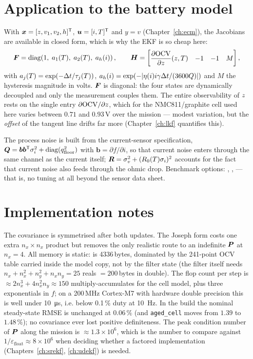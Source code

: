 \section{Application to the battery model}
With $\bm{x}=[z,v_1,v_2,h]^{\mathsf{T}}$, $\bm{u}=[i,T]^{\mathsf{T}}$ and $y=v$ (Chapter~\ref{ch:ecm}), the
Jacobians are available in closed form, which is why the EKF is so cheap here:
\begin{equation}
\bm{F} = \operatorname{diag}\!\left(1,\;a_1(T),\;a_2(T),\;a_h(i)\right), \qquad
\bm{H} = \begin{bmatrix}\dfrac{\partial \mathrm{OCV}}{\partial z}(z,T) & -1 & -1 & M\end{bmatrix},
\label{eq:ekf-battery-jac}
\end{equation}
with $a_j(T)=\exp(-\Delta t/\tau_j(T))$, $a_h(i)=\exp(-|\eta(i) i \gamma \Delta t/(3600Q)|)$ and $M$
the hysteresis magnitude in volts. $\bm{F}$ is diagonal: the four states are dynamically
decoupled and only the measurement couples them. The entire observability of $z$ rests on
the single entry $\partial\mathrm{OCV}/\partial z$, which for the NMC811/graphite cell used here
varies between $0.71$ and $0.93$\,V over the mission --- modest variation, but the
\emph{offset} of the tangent line drifts far more (Chapter~\ref{ch:lkf} quantifies this).

The process noise is built from the current-sensor specification,
$\bm{Q} = \bm{b}\bm{b}^{\mathsf{T}}\sigma_i^2 + \operatorname{diag}(q_{\text{floor}}^2)$ with
$\bm{b}=\partial f/\partial i$, so that current noise enters through the same channel as the
current itself; $\bm{R} = \sigma_v^2 + (R_0(T)\sigma_i)^2$ accounts for the fact that current
noise also feeds through the ohmic drop. Benchmark options: ,
,  --- that is, no tuning at
all beyond the sensor data sheet.

\section{Implementation notes}
The covariance is symmetrised after both updates. The Joseph form costs one extra
$n_x\times n_x$ product but removes the only realistic route to an indefinite $\bm{P}$ at
$n_x=4$. All memory is static:  is 4336\,bytes, dominated by the
241-point OCV table carried inside the model copy, not by the filter state (the filter itself
needs $n_x + n_x^2 + n_y^2 + n_x n_y = 25$ reals $=200$\,bytes in double).
The flop count per step is $\approx 2n_x^3 + 4n_x^2 n_y \approx 150$ multiply-accumulates for
the cell model, plus three exponentials in $f$; on a 200\,MHz Cortex-M7 with hardware
double precision this is well under \SI{10}{\micro\second}, i.e. below 0.1\,\% duty at
\SI{10}{\hertz}. In the  build the nominal steady-state RMSE is unchanged
at $0.06\,\%$ (and \texttt{aged\_cell} moves from $1.39$ to $1.48\,\%$); no covariance ever
lost positive definiteness. The peak
condition number of $\bm{P}$ along the mission is $\approx 1.3\times10^6$, which is the number
to compare against $1/\varepsilon_{\text{float}}\approx 8\times 10^6$ when deciding whether a
factored implementation (Chapters~\ref{ch:srekf}, \ref{ch:udekf}) is needed.

